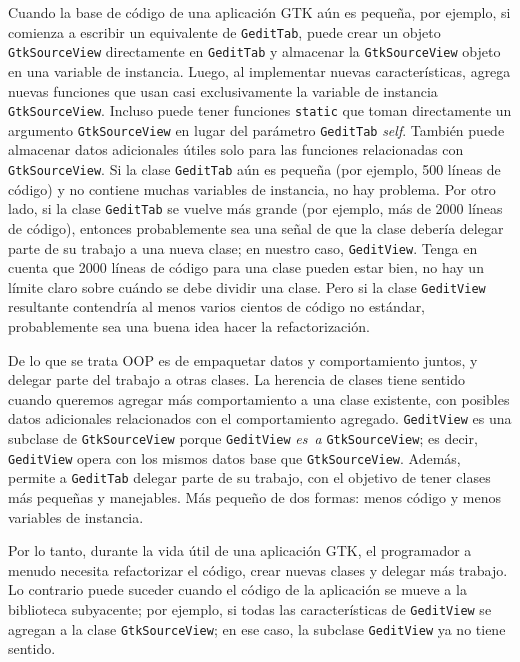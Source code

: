 Cuando la base de código de una aplicación GTK aún es pequeña, por ejemplo, si comienza a escribir un equivalente de \lstinline{GeditTab}, puede crear un objeto \lstinline{GtkSourceView} directamente en \lstinline{GeditTab} y almacenar la \lstinline{GtkSourceView} objeto en una variable de instancia. Luego, al implementar nuevas características, agrega nuevas funciones que usan casi exclusivamente la variable de instancia \lstinline{GtkSourceView}. Incluso puede tener funciones \lstinline{static} que toman directamente un argumento \lstinline{GtkSourceView} en lugar del parámetro \lstinline{GeditTab} \emph{self}. También puede almacenar datos adicionales útiles solo para las funciones relacionadas con \lstinline{GtkSourceView}. Si la clase \lstinline{GeditTab} aún es pequeña (por ejemplo, 500 líneas de código) y no contiene muchas variables de instancia, no hay problema. Por otro lado, si la clase \lstinline{GeditTab} se vuelve más grande (por ejemplo, más de 2000 líneas de código), entonces probablemente sea una señal de que la clase debería delegar parte de su trabajo a una nueva clase; en nuestro caso, \lstinline{GeditView}. Tenga en cuenta que 2000 líneas de código para una clase pueden estar bien, no hay un límite claro sobre cuándo se debe dividir una clase. Pero si la clase \lstinline{GeditView} resultante contendría al menos varios cientos de código no estándar, probablemente sea una buena idea hacer la refactorización.

De lo que se trata OOP es de empaquetar datos y comportamiento juntos, y delegar parte del trabajo a otras clases. La herencia de clases tiene sentido cuando queremos agregar más comportamiento a una clase existente, con posibles datos adicionales relacionados con el comportamiento agregado. \lstinline{GeditView} es una subclase de \lstinline{GtkSourceView} porque \lstinline{GeditView} \emph{es~a} \lstinline{GtkSourceView}; es decir, \lstinline{GeditView} opera con los mismos datos base que \lstinline{GtkSourceView}. Además, permite a \lstinline{GeditTab} delegar parte de su trabajo, con el objetivo de tener clases más pequeñas y manejables. Más pequeño de dos formas: menos código y menos variables de instancia.

Por lo tanto, durante la vida útil de una aplicación GTK, el programador a menudo necesita refactorizar el código, crear nuevas clases y delegar más trabajo. Lo contrario puede suceder cuando el código de la aplicación se mueve a la biblioteca subyacente; por ejemplo, si todas las características de \lstinline{GeditView} se agregan a la clase \lstinline{GtkSourceView}; en ese caso, la subclase \lstinline{GeditView} ya no tiene sentido.

